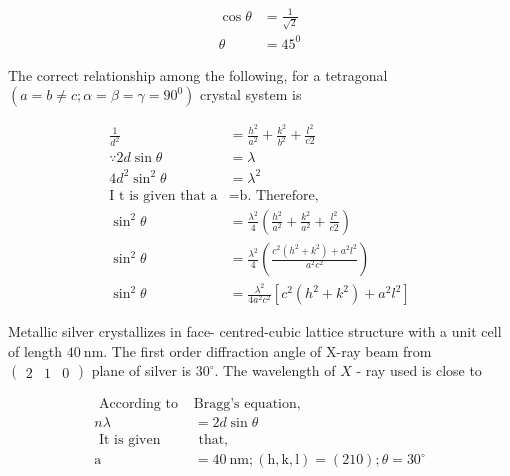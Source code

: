 \begin{enumerate}
\begin{answer}
$$\begin{aligned}
		\cos \theta &=\frac{1}{\sqrt{2}} \\
		\theta &=45^{0}
		\end{aligned}$$	
	\end{answer}
	\begin{minipage}{\textwidth}
		\item The correct relationship among the following, for a tetragonal $\left(a=b \neq c ; \alpha=\beta=\gamma=90^{0}\right)$ crystal system is
	\end{minipage}
	\begin{answer}
	\begin{align*}
		\frac{1}{d^{2}} &=\frac{h^{2}}{a^{2}}+\frac{k^{2}}{b^{2}}+\frac{l^{2}}{c 2} \\
		\because 2 d \sin \theta &=\lambda \\
		4 d^{2} \sin ^{2} \theta &=\lambda^{2}\\
		\text{I $\mathrm{t}$ is given that $\mathrm{a}$}&\text{=$\mathrm{b}$. Therefore,}\\
		\sin ^{2} \theta &=\frac{\lambda^{2}}{4}\left(\frac{h^{2}}{a^{2}}+\frac{k^{2}}{a^{2}}+\frac{l^{2}}{c 2}\right) \\
		\sin ^{2} \theta &=\frac{\lambda^{2}}{4}\left(\frac{c^{2}\left(h^{2}+k^{2}\right)+a^{2} l^{2}}{a^{2} c^{2}}\right) \\
		\sin ^{2} \theta &=\frac{\lambda^{2}}{4 a^{2} c^{2}}\left[c^{2}\left(h^{2}+k^{2}\right)+a^{2} l^{2}\right]
		\end{align*}
	\end{answer}
	\begin{minipage}{\textwidth}
		\item Metallic silver crystallizes in face- centred-cubic lattice structure with a unit cell of length $40 \mathrm{~nm}$. The first order diffraction angle of $\mathrm{X}$-ray beam from $\left(\begin{array}{lll}2 & 1 & 0\end{array}\right)$ plane of silver is $30^{\circ} .$ The wavelength of $X$ - ray used is close to
	\end{minipage}
	\begin{answer}
		\begin{align*}
	\text{	According to }&\text{Bragg's equation,}\\
		n \lambda&=2 d \sin \theta\\
	\text{	It is given}&\text{ that,}\\
		\mathrm{a}&=40 \mathrm{~nm} ;(\mathrm{h}, \mathrm{k}, \mathrm{l})=(210) ; \theta=30^{\circ}\\

\end{align*}
\end{answer}
\end{enumerate}
